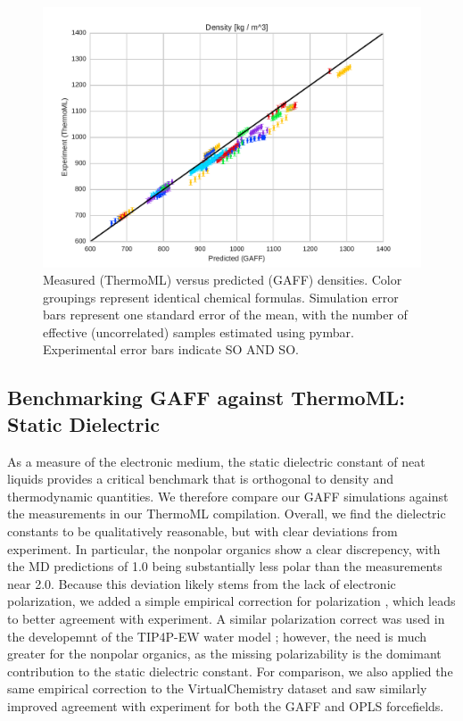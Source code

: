 \documentclass[journal=jacsat,manuscript=article]{achemso}
\begin{document}
\begin{figure}
\includegraphics[width=\columnwidth]{./figures/densities_thermoml.pdf}
\caption{Measured (ThermoML) versus predicted (GAFF) densities.  Color groupings represent identical chemical formulas.  Simulation error bars represent one standard error of the mean, with the number of effective (uncorrelated) samples estimated using pymbar.  Experimental error bars indicate SO AND SO.
}
\end{figure}


\subsection{Benchmarking GAFF against ThermoML: Static Dielectric}

As a measure of the electronic medium, the static dielectric constant of neat liquids provides a critical benchmark that is orthogonal to density and thermodynamic quantities.  We therefore compare our GAFF simulations against the measurements in our ThermoML compilation.  Overall, we find the dielectric constants to be qualitatively reasonable, but with clear deviations from experiment.  In particular, the nonpolar organics show a clear discrepency, with the MD predictions of 1.0 being substantially less polar than the measurements near 2.0.  Because this deviation likely stems from the lack of electronic polarization, we added a simple empirical correction for polarization \cite{bosque2002polarizabilities}, which leads to better agreement with experiment.  A similar polarization correct was used in the developemnt of the TIP4P-EW water model \cite{horn2004}; however, the need is much greater for the nonpolar organics, as the missing polarizability is the domimant contribution to the static dielectric constant.  For comparison, we also applied the same empirical correction to the VirtualChemistry dataset and saw similarly improved agreement with experiment for both the GAFF and OPLS forcefields.
\end{document}
